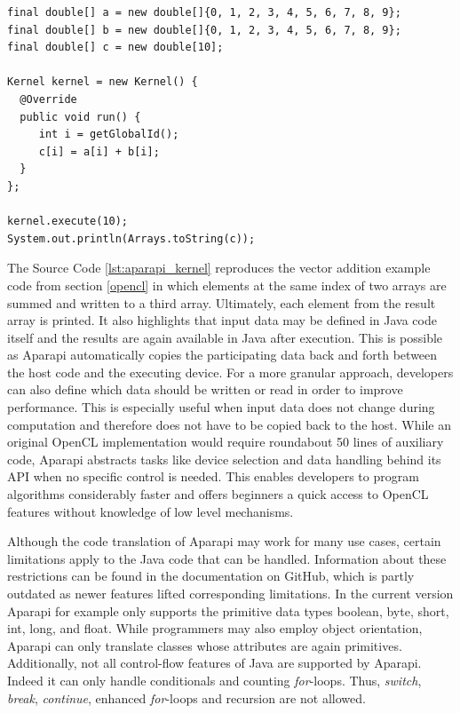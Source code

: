 \begin{minipage}{\linewidth}
\begin{lstlisting}[caption=Aparapi Vector Addition Kernel,captionpos=b,label=lst:aparapi_kernel]
final double[] a = new double[]{0, 1, 2, 3, 4, 5, 6, 7, 8, 9};
final double[] b = new double[]{0, 1, 2, 3, 4, 5, 6, 7, 8, 9};
final double[] c = new double[10];

Kernel kernel = new Kernel() {
  @Override
  public void run() {
     int i = getGlobalId();
     c[i] = a[i] + b[i];
  }
};

kernel.execute(10);
System.out.println(Arrays.toString(c));
\end{lstlisting}
\end{minipage}
The Source Code \ref{lst:aparapi_kernel} reproduces the vector addition example code from section \ref{opencl} in which elements at the same index of two arrays are summed and written to a third array. Ultimately, each element from the result array is printed. It also highlights that input data may be defined in Java code itself and the results are again available in Java after execution. This is possible as Aparapi automatically copies the participating data back and forth between the host code and the executing device. For a more granular approach, developers can also define which data should be written or read in order to improve performance. This is especially useful when input data does not change during computation and therefore does not have to be copied back to the host. While an original OpenCL implementation would require roundabout 50 lines of auxiliary code, Aparapi abstracts tasks like device selection and data handling behind its API when no specific control is needed. This enables developers to program algorithms considerably faster and offers beginners a quick access to OpenCL features without knowledge of low level mechanisms.

Although the code translation of Aparapi may work for many use cases, certain limitations apply to the Java code that can be handled. Information about these restrictions can be found in the documentation on GitHub\cite{aparapi_kernel_guidelines}, which is partly outdated as newer features lifted corresponding limitations. In the current version Aparapi for example only supports the primitive data types boolean, byte, short, int, long, and float. While programmers may also employ object orientation, Aparapi can only translate classes whose attributes are again primitives. Additionally, not all control-flow features of Java are supported by Aparapi. Indeed it can only handle conditionals and counting \textit{for}-loops. Thus, \textit{switch}, \textit{break}, \textit{continue}, enhanced \textit{for}-loops and recursion are not allowed.
